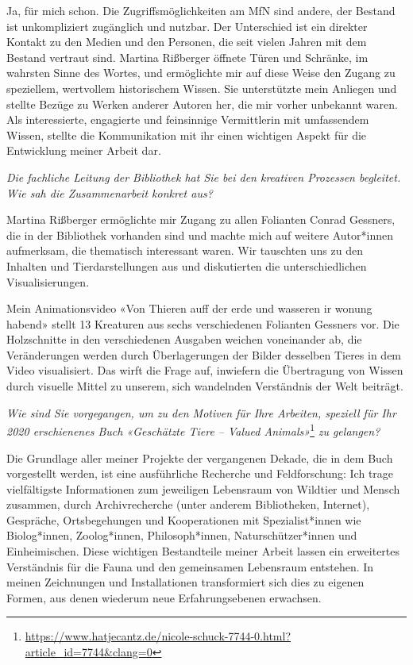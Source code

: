 \documentclass[a4paper,
fontsize=11pt,
oneside,
numbers=noperiodatend,
parskip=half-,
bibliography=totoc,
final
]{scrartcl}
\begin{document}
Ja, für mich schon. Die Zugriffsmöglichkeiten am MfN sind andere, der
Bestand ist unkompliziert zugänglich und nutzbar. Der Unterschied ist
ein direkter Kontakt zu den Medien und den Personen, die seit vielen
Jahren mit dem Bestand vertraut sind. Martina Rißberger öffnete Türen
und Schränke, im wahrsten Sinne des Wortes, und ermöglichte mir auf
diese Weise den Zugang zu speziellem, wertvollem historischem Wissen.
Sie unterstützte mein Anliegen und stellte Bezüge zu Werken anderer
Autoren her, die mir vorher unbekannt waren. Als interessierte,
engagierte und feinsinnige Vermittlerin mit umfassendem Wissen, stellte
die Kommunikation mit ihr einen wichtigen Aspekt für die Entwicklung
meiner Arbeit dar.

\emph{Die fachliche Leitung der Bibliothek hat Sie bei den kreativen
Prozessen begleitet. Wie sah die Zusammenarbeit konkret aus?}

Martina Rißberger ermöglichte mir Zugang zu allen Folianten Conrad
Gessners, die in der Bibliothek vorhanden sind und machte mich auf
weitere Autor*innen aufmerksam, die thematisch interessant waren. Wir
tauschten uns zu den Inhalten und Tierdarstellungen aus und diskutierten
die unterschiedlichen Visualisierungen.

Mein Animationsvideo «Von Thieren auff der erde und wasseren ir wonung
habend» stellt 13 Kreaturen aus sechs verschiedenen Folianten Gessners
vor. Die Holzschnitte in den verschiedenen Ausgaben weichen voneinander
ab, die Veränderungen werden durch Überlagerungen der Bilder desselben
Tieres in dem Video visualisiert. Das wirft die Frage auf, inwiefern die
Übertragung von Wissen durch visuelle Mittel zu unserem, sich wandelnden
Verständnis der Welt beiträgt.

\emph{Wie sind Sie vorgegangen, um zu den Motiven für Ihre Arbeiten,
speziell für Ihr 2020 erschienenes Buch «Geschätzte Tiere -- Valued
Animals»}\footnote{\url{https://www.hatjecantz.de/nicole-schuck-7744-0.html?article_id=7744\&clang=0}}
\emph{zu gelangen?}

Die Grundlage aller meiner Projekte der vergangenen Dekade, die in dem
Buch vorgestellt werden, ist eine ausführliche Recherche und
Feldforschung: Ich trage vielfältigste Informationen zum jeweiligen
Lebensraum von Wildtier und Mensch zusammen, durch Archivrecherche
(unter anderem Bibliotheken, Internet), Gespräche, Ortsbegehungen und
Kooperationen mit Spezialist*innen wie Biolog*innen, Zoolog*innen,
Philosoph*innen, Naturschützer*innen und Einheimischen. Diese wichtigen
Bestandteile meiner Arbeit lassen ein erweitertes Verständnis für die
Fauna und den gemeinsamen Lebensraum entstehen. In meinen Zeichnungen
und Installationen transformiert sich dies zu eigenen Formen, aus denen
wiederum neue Erfahrungsebenen erwachsen.
\end{document}
